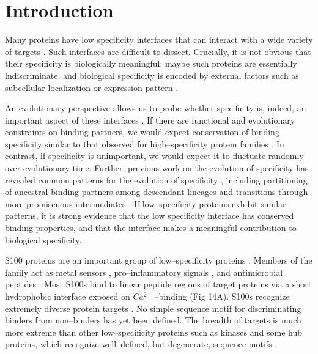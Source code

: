 \section{Introduction}

Many proteins have low specificity interfaces that can interact with
a wide variety of targets \citep{kreegipuu_statistical_1998,chin_calmodulin:_2000,ekman_what_2006,schreiber_protein_2011,nakahara_tobacco_2012,bertolazzi_functional_2013,nakagawa_dna-binding_2013,mitchell_evolutionary_2013,peleg_evolution_2014,howard_ancestral_2014,uchikoga_specificity_2016}.
Such interfaces are difficult to dissect. Crucially, it is not obvious
that their specificity is biologically meaningful: maybe such proteins
are essentially indiscriminate, and biological specificity is encoded
by external factors such as subcellular localization or expression
pattern \citep{bhattacharya_target_2004,ekman_what_2006,chazin_relating_2011}. 

An evolutionary perspective allows us to probe whether specificity
is, indeed, an important aspect of these interfaces \citep{harms_evolutionary_2013}.
If there are functional and evolutionary constraints on binding partners,
we would expect conservation of binding specificity similar to that
observed for high--specificity protein families \citep{mckeown_evolution_2014,boucher_atomic-resolution_2014}.
In contrast, if specificity is unimportant, we would expect it to
fluctuate randomly over evolutionary time. Further, previous work
on the evolution of specificity has revealed common patterns for the
evolution of specificity \citep{khersonsky_enzyme_2010,copley_toward_2012,wheeler_thermostability_2016},
including partitioning of ancestral binding partners among descendant
lineages \citep{eick_evolution_2012,hudson_distal_2015,clifton_ancestral_2016,alhindi_protein_2017}
and transitions through more promiscuous intermediates \citep{aakre_evolving_2015,howard_ancestral_2014,sayou_promiscuous_2014}.
If low--specificity proteins exhibit similar patterns, it is strong
evidence that the low specificity interface has conserved binding
properties, and that the interface makes a meaningful contribution
to biological specificity. 

S100 proteins are an important group of low--specificity proteins \citep{marenholz_s100_2004,donato_functions_2013}.
Members of the family act as metal sensors \citep{sivaraja_copper_2006},
pro--inflammatory signals \citep{carreira_s100a13_1998,yang_s100a12_2007,leclerc_binding_2009,cho_pentamidine_2016},
and antimicrobial peptides \citep{damo_molecular_2013}. Most S100s
bind to linear peptide regions of target proteins via a short hydrophobic
interface exposed on $Ca^{2+}$--binding (Fig 14A). S100s recognize
extremely diverse protein targets \citep{santamaria-kisiel_calcium-dependent_2006,donato_functions_2013,streicher_annexin_2009}.
No simple sequence motif for discriminating binders from non--binders
has yet been defined. The breadth of targets is much more extreme
than other low--specificity proteins such as kinases and some hub proteins,
which recognize well--defined, but degenerate, sequence motifs \citep{kreegipuu_statistical_1998,ekman_what_2006,bertolazzi_functional_2013,howard_ancestral_2014,uchikoga_specificity_2016}. 

